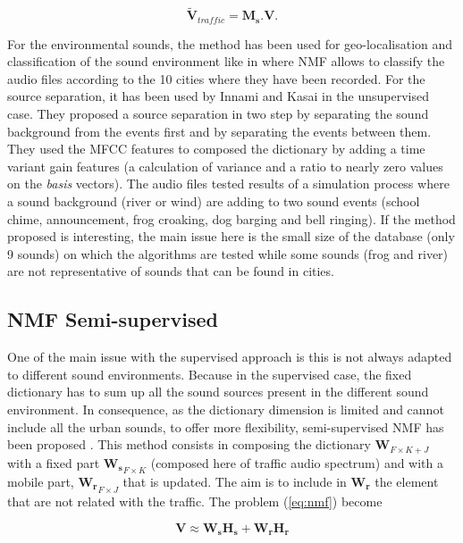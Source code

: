 \documentclass[twocolumn,a4paper,10pt]{article}
\begin{document}
\begin{equation}\label{eq:separation}
\mathbf{\tilde{V}}_{traffic} = \mathbf{M_s}.\mathbf{V}.
\end{equation}

For the environmental sounds, the method has been used for geo-localisation and classification of the sound environment like in \cite{kumar_audio_2016} where NMF allows to classify the audio files according to the 10 cities where they have been recorded. For the source separation, it has been used by Innami and Kasai in the unsupervised case. They proposed a source separation in two step  by separating the sound background from the events first and by separating the events between them. They used the MFCC features to composed the dictionary by adding a time variant gain features (a calculation of variance and a ratio to nearly zero values on the \textit{basis} vectors). The audio files tested results of a simulation process where a sound background (river or wind) are adding to two sound events (school chime, announcement, frog croaking, dog barging and bell ringing). If the method proposed is interesting, the main issue here is the small size of the database (only 9 sounds) on which the algorithms are tested while some sounds (frog and river) are not representative of sounds that can be found in cities.

\subsection{NMF Semi-supervised}

One of the main issue with the supervised approach is this is not always adapted to different sound environments. Because in the supervised case, the fixed dictionary has to sum up all the sound sources present in the different sound environment. In consequence, as the dictionary dimension is limited and cannot include all the urban sounds, to offer more flexibility, semi-supervised NMF has been proposed \cite{lee_semi-supervised_2010}. This method consists in composing the dictionary $\mathbf{W}_{F \times K+J}$ with a fixed part $\mathbf{W_s}_{F \times K}$ (composed here of traffic audio spectrum) and with a mobile part, $\mathbf{W_r}_{F \times J}$ that is updated. The aim is to include in $\mathbf{W_r}$ the element that are not related with the traffic. The problem (\ref{eq:nmf}) become

\begin{equation}
\mathbf{V} \approx \mathbf{W_s H_s}+ \mathbf{W_r H_r}
\end{equation}
\end{document}
